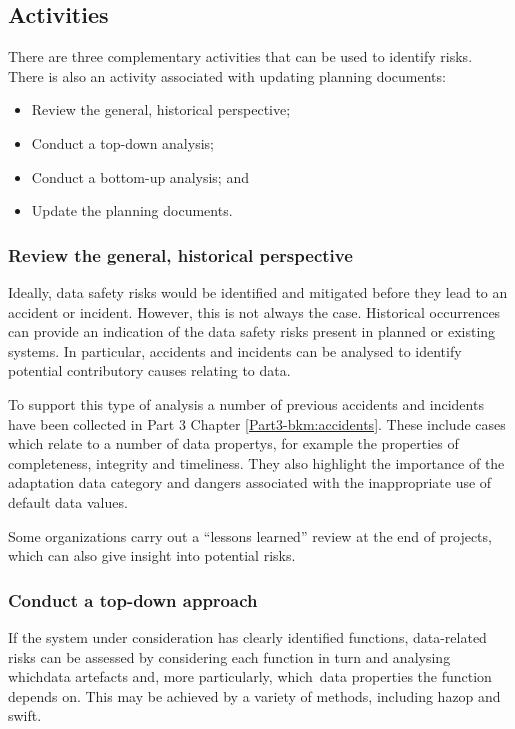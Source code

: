 \subsection{Activities}
There are three complementary activities that can be used to identify risks. There is also an activity associated with updating planning documents:
\begin{itemize}
	\item Review the general, historical perspective;
	\item Conduct a top-down analysis;
	\item Conduct a bottom-up analysis; and
	\item Update the planning documents.
\end{itemize}

\subsubsection{Review the general, historical perspective}
Ideally, data safety risks would be identified and mitigated before they lead to an accident or incident. However, this is not always the case. Historical occurrences can provide an indication of the data safety risks present in planned or existing systems. In particular, accidents and incidents can be analysed to identify potential contributory causes relating to data.

To support this type of analysis a number of previous accidents and incidents have been collected in Part 3 Chapter \autoref{Part3-bkm:accidents}.
These include cases which relate to a number of \glspl{data property},
for example the properties of \gls{completeness}, \gls{integrity} and \gls{timeliness}.
They also highlight the importance of the \gls{adaptation data} category and dangers associated with the inappropriate use of default data values.

Some organizations carry out a ``lessons learned'' review at the end of projects, which can also give insight into potential risks.
\subsubsection{Conduct a top-down approach}
If the system under consideration has clearly identified functions, data-related risks can be assessed by considering each function in turn and analysing \cbstart which\cbend{}\glspl{data artefact} and, more particularly, \cbstart which\cbend\ data properties the function depends on. This may be achieved by a variety of methods, including \gls{hazop} and \gls{swift}.


